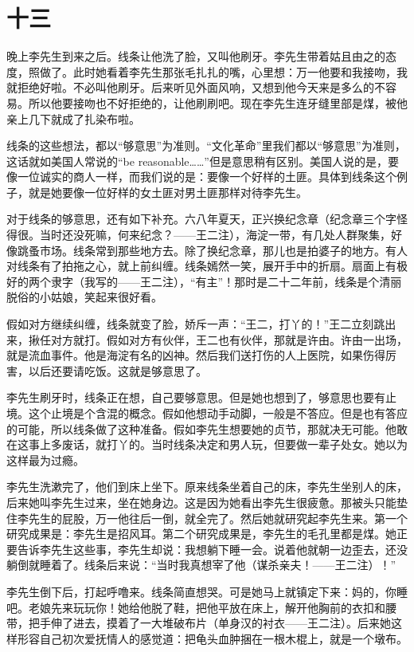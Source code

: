\section{十三}

晚上李先生到来之后。线条让他洗了脸，又叫他刷牙。李先生带着姑且由之的态度，照做了。此时她看着李先生那张毛扎扎的嘴，心里想：万一他要和我接吻，我就拒绝好啦。不必叫他刷牙。后来听见外面风响，又想到他今天来是多么的不容易。所以他要接吻也不好拒绝的，让他刷刷吧。现在李先生连牙缝里部是煤，被他亲上几下就成了扎染布啦。 

线条的这些想法，都以“够意思”为准则。“文化革命”里我们都以“够意思”为准则，这话就如美国人常说的“be reasonable……”但是意思稍有区别。美国人说的是，要像一位诚实的商人一样，而我们说的是：要像一个好样的土匪。具体到线条这个例子，就是她要像一位好样的女土匪对男土匪那样对待李先生。 

对于线条的够意思，还有如下补充。六八年夏天，正兴换纪念章（纪念章三个字怪得很。当时还没死嘛，何来纪念？——王二注），海淀一带，有几处人群聚集，好像跳蚤市场。线条常到那些地方去。除了换纪念章，那儿也是拍婆子的地方。有人对线条有了拍拖之心，就上前纠缠。线条嫣然一笑，展开手中的折扇。扇面上有极好的两个隶字（我写的——王二注），“有主”！那时是二十二年前，线条是个清丽脱俗的小姑娘，笑起来很好看。 


假如对方继续纠缠，线条就变了脸，娇斥一声：“王二，打丫的！”王二立刻跳出来，揪任对方就打。假如对方有伙伴，王二也有伙伴，那就是许由。许由一出场，就是流血事件。他是海淀有名的凶神。然后我们送打伤的人上医院，如果伤得厉害，以后还要请吃饭。这就是够意思了。 

李先生刷牙时，线条正在想，自己要够意思。但是她也想到了，够意思也要有止境。这个止境是个含混的概念。假如他想动手动脚，一般是不答应。但是也有答应的可能，所以线条做了这种准备。假如李先生想要她的贞节，那就决无可能。他敢在这事上多废话，就打丫的。当时线条决定和男人玩，但要做一辈子处女。她以为这样最为过瘾。 

李先生洗漱完了，他们到床上坐下。原来线条坐着自己的床，李先生坐别人的床，后来她叫李先生过来，坐在她身边。这是因为她看出李先生很疲惫。那被头只能垫住李先生的屁股，万一他往后一倒，就全完了。然后她就研究起李先生来。第一个研究成果是：李先生是招风耳。第二个研究成果是，李先生的毛孔里都是煤。她正要告诉李先生这些事，李先生却说：我想躺下睡一会。说着他就朝一边歪去，还没躺倒就睡着了。线条后来说：“当时我真想宰了他（谋杀亲夫！——王二注）！” 

李先生倒下后，打起呼噜来。线条简直想哭。可是她马上就镇定下来：妈的，你睡吧。老娘先来玩玩你！她给他脱了鞋，把他平放在床上，解开他胸前的衣扣和腰带，把手伸了进去，摸着了一大堆破布片（单身汉的衬衣——王二注）。后来她这样形容自己初次爱抚情人的感觉道：把龟头血肿捆在一根木棍上，就是一个墩布。 

